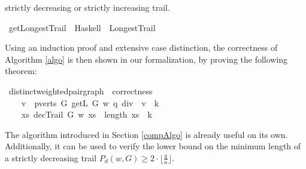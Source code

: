 \begin{isabellebody}
\begin{isamarkuptext}
strictly decreasing or strictly increasing trail.%
\end{isamarkuptext}\isamarkuptrue%
\isamarkupfalse%
\ getLongestTrail\ \ Haskell\ \ LongestTrail%
\isadelimproof
%
\endisadelimproof
%
\isatagproof
%
\endisatagproof
{\isafoldproof}%
%
\isadelimproof
%
\endisadelimproof
%
\isadelimproof
%
\endisadelimproof
%
\isatagproof
%
\endisatagproof
{\isafoldproof}%
%
\isadelimproof
%
\endisadelimproof
%
\isadelimproof
%
\endisadelimproof
%
\isatagproof
%
\endisatagproof
{\isafoldproof}%
%
\isadelimproof
%
\endisadelimproof
%
\isadelimproof
%
\endisadelimproof
%
\isatagproof
%
\endisatagproof
{\isafoldproof}%
%
\isadelimproof
%
\endisadelimproof
%
\begin{isamarkuptext}%
Using an induction proof and extensive case distinction, the correctness of Algorithm \ref{algo} 
is then shown in our formalization, by proving the following theorem:%
\end{isamarkuptext}\isamarkuptrue%
\isamarkupfalse%
{\isacharparenleft}\ distinct{\isacharunderscore}weighted{\isacharunderscore}pair{\isacharunderscore}graph{\isacharparenright}\ \ correctness{\isacharcolon}\isanewline
\ \ \ {\isachardoublequoteopen}{\isasymexists}\ v\ {\isasymin}\ {\isacharparenleft}pverts\ G{\isacharparenright}{\isachardot}\ getL\ G\ w\ {\isacharparenleft}q\ div\ {}{\isacharparenright}\ v\ {\isacharequal}\ k{\isachardoublequoteclose}\isanewline
\ \ \ {\isachardoublequoteopen}{\isasymexists}\ xs{\isachardot}\ decTrail\ G\ w\ xs\ {\isasymand}\ length\ xs\ {\isacharequal}\ k{\isachardoublequoteclose}%
\isadelimproof
%
\endisadelimproof
%
\isatagproof
%
\endisatagproof
{\isafoldproof}%
%
\isadelimproof
%
\endisadelimproof
%
\isadelimdocument
%
\endisadelimdocument
%
\isatagdocument
%
\isamarkuptrue%
%
\endisatagdocument
{\isafolddocument}%
%
\isadelimdocument
%
\endisadelimdocument
%
\isadelimproof
%
\endisadelimproof
%
\isatagproof
%
\endisatagproof
{\isafoldproof}%
%
\isadelimproof
%
\endisadelimproof
%
\begin{isamarkuptext}%
\label{minLength}
The algorithm introduced in Section \ref{compAlgo} is already useful on its own. Additionally, it can be
used to verify the lower bound on the minimum length of a strictly decreasing trail $P_d(w,G) \ge 2 \cdot \lfloor \frac{q}{n} \rfloor$.


\end{isamarkuptext}
\end{isabellebody}
